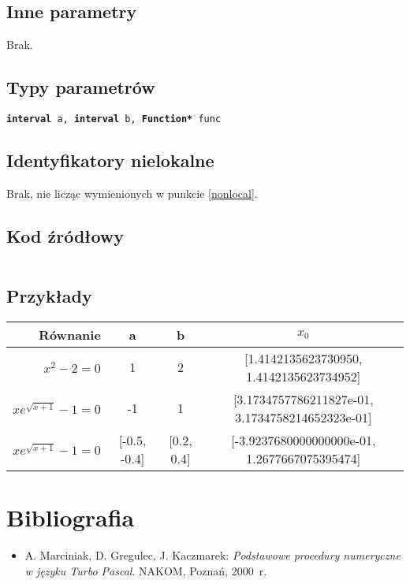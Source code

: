 \documentclass[12pt]{article}
\begin{document}
		\subsection{Inne parametry}
      Brak.

		\subsection{Typy parametrów}
      \texttt{\textbf{interval} a, \textbf{interval} b, \textbf{Function*} func}

		\subsection{Identyfikatory nielokalne}
      Brak, nie licząc wymienionych w punkcie \ref{nonlocal}.

		\subsection{Kod źródłowy}
			\inputminted[firstline=6, lastline=35]{c++}{../solvers/secant.cpp}

		\subsection{Przykłady}
			\begin{tabular}{|r|c|c||c|}
				\hline
				Równanie & a & b & $x_0$ \\\hline

				$x^2 - 2 = 0$ & 1 & 2 & [1.4142135623730950, 1.4142135623734952]\\\hline
				$xe^{\sqrt{x+1}} - 1 = 0$ & -1 & 1 & [3.1734757786211827e-01, 3.1734758214652323e-01]\\\hline
				$xe^{\sqrt{x+1}} - 1 = 0$ & [-0.5, -0.4] & [0.2, 0.4] & [-3.9237680000000000e-01, 1.2677667075395474]\\\hline

			\end{tabular}

	\section{Bibliografia}
		\begin{itemize}
		  \item A. Marciniak, D. Gregulec, J. Kaczmarek: \textsl{Podstawowe procedury numeryczne w języku Turbo Pascal}. NAKOM, Poznań, 2000~r.
		\end{itemize}
\end{document}
